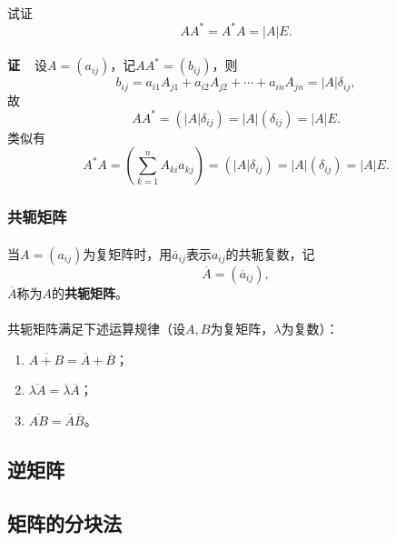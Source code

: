 \paragraph{}
试证
\begin{equation*}
  AA^* = A^*A = |A|E.
\end{equation*}

\paragraph{}
\textbf{证~~}设$A=(a_{ij})$，记$AA^*=(b_{ij})$，则
\begin{equation*}
  b_{ij} = a_{i1}A_{j1} + a_{i2}A_{j2} + \cdots + a_{in}A_{jn} = |A|\delta_{ij},
\end{equation*}
故
\begin{equation*}
  AA^* = (|A|\delta_{ij}) = |A|(\delta_{ij}) = |A|E.
\end{equation*}
类似有
\begin{equation*}
  A^*A = (\sum_{k=1}^nA_{ki}a_{kj}) = (|A|\delta_{ij}) = |A|(\delta_{ij}) = |A|E.
\end{equation*}

\subsubsection{共轭矩阵}
\paragraph{}
当$A=(a_{ij})$为复矩阵时，用$\overline{a}_{ij}$表示$a_{ij}$的共轭复数，记
\begin{equation*}
  \overline{A} = (\overline{a}_{ij}),
\end{equation*}
$\overline{A}$称为$A$的\textbf{共轭矩阵}。

\paragraph{}
共轭矩阵满足下述运算规律（设$A,B$为复矩阵，$\lambda$为复数）：
\begin{enumerate}
  \item $\overline{A+B}=\overline{A} + \overline{B}$；
  \item $\overline{\lambda A}=\overline{\lambda}\overline{A}$；
  \item $\overline{AB} = \overline{A}\overline{B}$。
\end{enumerate}

\subsection{逆矩阵}
\paragraph{}

\subsection{矩阵的分块法}
\paragraph{}

